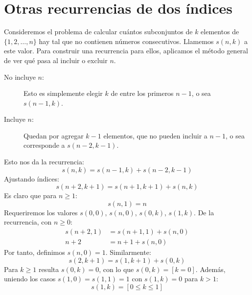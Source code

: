 %

\section{Otras recurrencias de dos índices}
\label{sec:recurrencia-2-indices}

  Consideremos el problema de calcular
  cuántos subconjuntos de \(k\) elementos de \(\{1, 2, \dotsc, n\}\)
  hay tal que no contienen números consecutivos.
  Llamemos \(s(n, k)\) a este valor.
  Para construir una recurrencia para ellos,
  aplicamos el método general de ver qué pasa al incluir o excluir \(n\).
  \begin{description}
  \item[\boldmath No incluye \(n\):\unboldmath]
    Esto es simplemente elegir \(k\) de entre los primeros \(n - 1\),
    o sea \(s(n - 1, k)\).
  \item[\boldmath Incluye \(n\):\unboldmath]
    Quedan por agregar \(k - 1\) elementos,
    que no pueden incluir a \(n - 1\),
    o sea corresponde a \(s(n - 2, k - 1)\).
  \end{description}
  Esto nos da la recurrencia:
  \begin{equation*}
    s(n, k)
      = s(n - 1, k) + s(n - 2, k - 1)
  \end{equation*}
  Ajustando índices:
  \begin{equation}
    \label{eq:recurrence-s-1}
    s(n + 2, k + 1)
      = s(n + 1, k + 1) + s(n, k)
  \end{equation}
  Es claro que para \(n \ge 1\):
  \begin{equation}
    s(n, 1)
      = n
	   \label{eq:recurrence-s(n,1)-boundary}
  \end{equation}
  Requeriremos
  los valores \(s(0, 0)\), \(s(n, 0)\), \(s(0, k)\), \(s(1, k)\).
  De la recurrencia,
  con \(n \ge 0\):
  \begin{align*}
    s(n + 2, 1)
      &= s(n + 1, 1) + s(n, 0) \\
    n + 2
      &= n + 1 + s(n, 0)
  \end{align*}
  Por tanto,
  definimos \(s(n, 0) = 1\).
  Similarmente:
  \begin{equation*}
    s(2, k + 1)
      = s(1, k + 1) + s(0, k)
  \end{equation*}
  Para \(k \ge 1\) resulta \(s(0, k) = 0\),
  con lo que \(s(0, k) = [k = 0]\).
  Además,
  uniendo los casos \(s(1, 0) = s(1, 1) = 1\)
  con \(s(1, k) = 0\) para \(k > 1\):
  \begin{equation*}
    s(1, k)
      = [ 0 \le k \le 1 ]
  \end{equation*}

